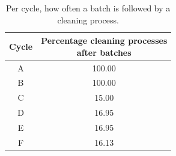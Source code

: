 \documentclass[../Thesis.tex]{subfiles}
\begin{document}
\begin{table}[h]
    \centering
    \begin{tabular}{c|c}
        Cycle & \makecell{Percentage cleaning processes\\ after batches} \\ \hline
        A     & 100.00      \\
        B     & 100.00      \\
        C     & 15.00       \\
        D     & 16.95       \\
        E     & 16.95       \\
        F     & 16.13
    \end{tabular}
    \caption{Per cycle, how often a batch is followed by a cleaning process.}
    \label{tab:cycle cleaning prob}
\end{table}











\end{document}
